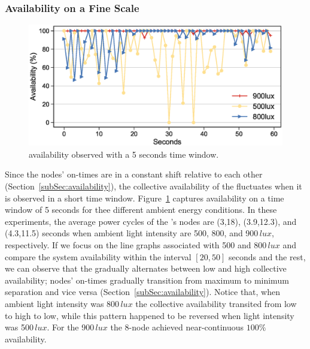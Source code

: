 \subsubsection{Availability on a Fine Scale}
%
\begin{figure}[t]
    \centering
     \includegraphics[width=\columnwidth]{figures/sysAvailabilityTimeline_470_sleep_5seconds}
    \caption{\cis availability observed with a 5 seconds time window.}
    \label{fig:fineScaleAvailability}
\end{figure}
Since the nodes' on-times are in a constant shift relative to each other (Section~\ref{subSec:availability}), the collective availability of the \cis fluctuates when it is observed in a short time window. 
Figure~\ref{fig:fineScaleAvailability} captures \cis availability on a time window of 5 seconds for thee different ambient energy conditions. In these experiments, the average power cycles of the \cis's nodes are (3,18), (3.9,12.3), and (4.3,11.5) seconds when ambient light intensity are 500, 800, and 900\,$\si{lux}$, respectively. 
If we focus on the line graphs associated with 500 and 800\,$\si{lux}$ and compare the system availability within the interval $[20,50]$ seconds and the rest, we can observe that the \cis gradually alternates between low and high collective availability; nodes' on-times gradually transition from maximum to minimum separation and vice versa (Section~\ref{subSec:availability}). Notice that, when ambient light intensity was 800\,$\si{lux}$ the \cis collective availability transited from low to high to low, while this pattern happened to be reversed when light intensity was  500\,$\si{lux}$. For the 900\,$\si{lux}$ the 8-node \cis achieved near-continuous $100\%$ availability. 
%
